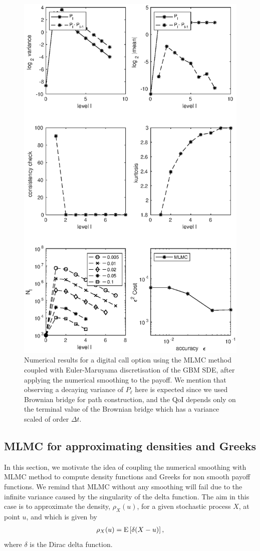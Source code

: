 \FloatBarrier
	\begin{figure}[h!]
\centering
\includegraphics[width=0.7\linewidth]{./figures/MLMC_binary_opt/digital_option_with_smoothing_L_0_2_steps}

\caption{Numerical results for a digital call option using the MLMC method coupled with Euler-Maruyama discretisation of the GBM SDE, after applying  the numerical smoothing to the payoff. We mention that observing a decaying variance of $P_{\ell}$ here is expected since we used Brownian bridge for path construction, and the QoI depends only on the terminal value of the Brownian bridge which has a variance scaled of order $\Delta t$.}
\label{fig:euler_digital_with_smoothing}
\end{figure}

\FloatBarrier


\subsection{MLMC for approximating densities and Greeks}\label{sec: MLMC for approximating densities and greeks}
In this section, we motivate the idea of coupling the numerical smoothing  with MLMC method to compute density functions and Greeks for non smooth payoff functions. We remind that MLMC without any smoothing  will fail due to the infinite variance caused by the singularity of  the delta function. The aim in this case is to approximate the density, $\rho_{X}(u)$, for a given stochastic process $X$, at point $u$, and which is given by 
\begin{align}
\rho_{X}(u)=\mathrm{E}\left[\delta(X-u)\right],
\end{align}
where $\delta$ is the Dirac delta function.

